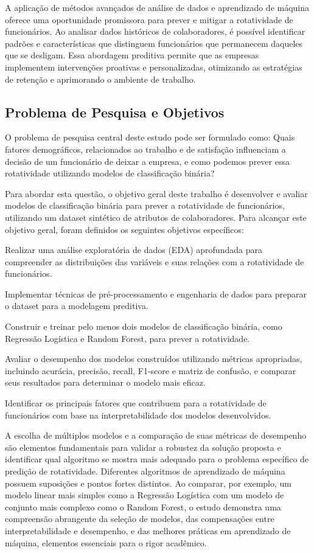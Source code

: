 \documentclass[sigconf]{acmart}
\begin{document}
A aplicação de métodos avançados de análise de dados e aprendizado de máquina oferece uma oportunidade promissora para prever e mitigar a rotatividade de funcionários. Ao analisar dados históricos de colaboradores, é possível identificar padrões e características que distinguem funcionários que permanecem daqueles que se desligam. Essa abordagem preditiva permite que as empresas implementem intervenções proativas e personalizadas, otimizando as estratégias de retenção e aprimorando o ambiente de trabalho.

\subsection{Problema de Pesquisa e Objetivos}
O problema de pesquisa central deste estudo pode ser formulado como: Quais fatores demográficos, relacionados ao trabalho e de satisfação influenciam a decisão de um funcionário de deixar a empresa, e como podemos prever essa rotatividade utilizando modelos de classificação binária?

Para abordar esta questão, o objetivo geral deste trabalho é desenvolver e avaliar modelos de classificação binária para prever a rotatividade de funcionários, utilizando um dataset sintético de atributos de colaboradores. Para alcançar este objetivo geral, foram definidos os seguintes objetivos específicos:

Realizar uma análise exploratória de dados (EDA) aprofundada para compreender as distribuições das variáveis e suas relações com a rotatividade de funcionários.

Implementar técnicas de pré-processamento e engenharia de dados para preparar o dataset para a modelagem preditiva.

Construir e treinar pelo menos dois modelos de classificação binária, como Regressão Logística e Random Forest, para prever a rotatividade.

Avaliar o desempenho dos modelos construídos utilizando métricas apropriadas, incluindo acurácia, precisão, recall, F1-score e matriz de confusão, e comparar seus resultados para determinar o modelo mais eficaz.

Identificar os principais fatores que contribuem para a rotatividade de funcionários com base na interpretabilidade dos modelos desenvolvidos.

A escolha de múltiplos modelos e a comparação de suas métricas de desempenho são elementos fundamentais para validar a robustez da solução proposta e identificar qual algoritmo se mostra mais adequado para o problema específico de predição de rotatividade. Diferentes algoritmos de aprendizado de máquina possuem suposições e pontos fortes distintos. Ao comparar, por exemplo, um modelo linear mais simples como a Regressão Logística com um modelo de conjunto mais complexo como o Random Forest, o estudo demonstra uma compreensão abrangente da seleção de modelos, das compensações entre interpretabilidade e desempenho, e das melhores práticas em aprendizado de máquina, elementos essenciais para o rigor acadêmico.
\end{document}
